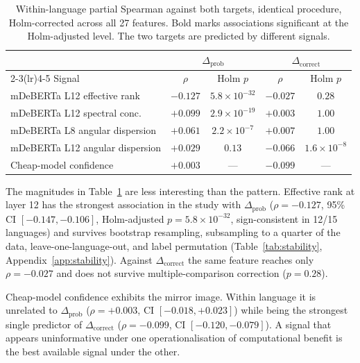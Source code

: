\documentclass[11pt]{article}
\begin{document}
\begin{table}[t]
\centering
\small
\begin{tabular}{lcccc}
\toprule
& \multicolumn{2}{c}{$\Delta_{\mathrm{prob}}$}
& \multicolumn{2}{c}{$\Delta_{\mathrm{correct}}$} \\
\cmidrule(lr){2-3}\cmidrule(lr){4-5}
Signal & $\rho$ & Holm $p$ & $\rho$ & Holm $p$ \\
\midrule
mDeBERTa L12 effective rank      & $\mathbf{-0.127}$ & $5.8\!\times\!10^{-32}$ & $-0.027$ & $0.28$ \\
mDeBERTa L12 spectral conc.      & $+0.099$ & $2.9\!\times\!10^{-19}$ & $+0.003$ & $1.00$ \\
mDeBERTa L8 angular dispersion   & $+0.061$ & $2.2\!\times\!10^{-7}$  & $+0.007$ & $1.00$ \\
mDeBERTa L12 angular dispersion  & $+0.029$ & $0.13$ & $\mathbf{-0.066}$ & $1.6\!\times\!10^{-8}$ \\
\midrule
Cheap-model confidence           & $+0.003$ & --- & $\mathbf{-0.099}$ & --- \\
\bottomrule
\end{tabular}
\caption{Within-language partial Spearman against both targets, identical
procedure, Holm-corrected across all 27 features. Bold marks associations
significant at the Holm-adjusted level. The two targets are predicted by
different signals.}
\label{tab:swap}
\end{table}

The magnitudes in Table~\ref{tab:swap} are less interesting than the pattern.
Effective rank at layer 12 has the strongest association in the study with
$\Delta_{\mathrm{prob}}$ ($\rho = -0.127$, 95\% CI $[-0.147, -0.106]$,
Holm-adjusted $p = 5.8 \times 10^{-32}$, sign-consistent in 12/15 languages) and
survives bootstrap resampling, subsampling to a quarter of the data,
leave-one-language-out, and label permutation
(Table~\ref{tab:stability}, Appendix~\ref{app:stability}). Against $\Delta_{\mathrm{correct}}$ the same
feature reaches only $\rho = -0.027$ and does not survive multiple-comparison
correction ($p = 0.28$).

Cheap-model confidence exhibits the mirror image. Within language it is
unrelated to $\Delta_{\mathrm{prob}}$ ($\rho = +0.003$, CI $[-0.018, +0.023]$)
while being the strongest single predictor of $\Delta_{\mathrm{correct}}$
($\rho = -0.099$, CI $[-0.120, -0.079]$). A signal that appears uninformative
under one operationalisation of computational benefit is the best available
signal under the other.
\end{document}
